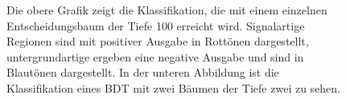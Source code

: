 \begin{figure}[tbp]
\centering     %
{}
\parbox[b]{12cm}{
\caption{Die obere Grafik zeigt die Klassifikation, die mit einem einzelnen Entscheidungsbaum der Tiefe 100 erreicht wird. Signalartige Regionen sind mit positiver Ausgabe in Rott\"onen dargestellt, untergrundartige ergeben eine negative Ausgabe und sind in Blaut\"onen dargestellt. In der unteren Abbildung ist die Klassifikation eines BDT mit zwei B\"aumen der Tiefe zwei zu sehen.}
}
\label{fig:boosting}
\end{figure}

